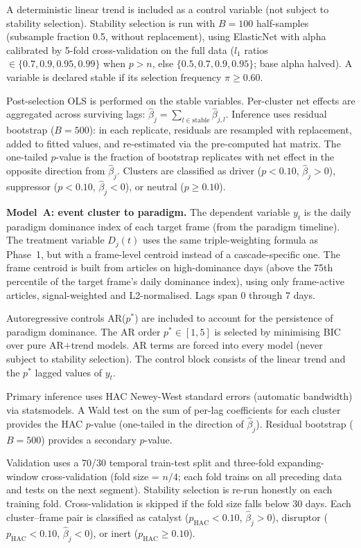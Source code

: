 A deterministic linear trend is included as a control variable (not subject to stability selection). Stability selection is run with $B = 100$ half-samples (subsample fraction 0.5, without replacement), using ElasticNet with alpha calibrated by 5-fold cross-validation on the full data ($l_1$ ratios $\in \{0.7, 0.9, 0.95, 0.99\}$ when $p > n$, else $\{0.5, 0.7, 0.9, 0.95\}$; base alpha halved). A variable is declared stable if its selection frequency $\hat{\pi} \geq 0.60$.

Post-selection OLS is performed on the stable variables. Per-cluster net effects are aggregated across surviving lags: $\hat{\beta}_j = \sum_{l \in \text{stable}} \hat{\beta}_{j,l}$. Inference uses residual bootstrap ($B = 500$): in each replicate, residuals are resampled with replacement, added to fitted values, and re-estimated via the pre-computed hat matrix. The one-tailed $p$-value is the fraction of bootstrap replicates with net effect in the opposite direction from $\hat{\beta}_j$. Clusters are classified as driver ($p < 0.10$, $\hat{\beta}_j > 0$), suppressor ($p < 0.10$, $\hat{\beta}_j < 0$), or neutral ($p \geq 0.10$).

\textbf{Model~A: event cluster to paradigm.} The dependent variable $y_t$ is the daily paradigm dominance index of each target frame (from the paradigm timeline). The treatment variable $D_j(t)$ uses the same triple-weighting formula as Phase~1, but with a frame-level centroid instead of a cascade-specific one. The frame centroid is built from articles on high-dominance days (above the 75th percentile of the target frame's daily dominance index), using only frame-active articles, signal-weighted and L2-normalised. Lags span 0 through 7 days.

Autoregressive controls AR($p^*$) are included to account for the persistence of paradigm dominance. The AR order $p^* \in [1, 5]$ is selected by minimising BIC over pure AR$+$trend models. AR terms are forced into every model (never subject to stability selection). The control block consists of the linear trend and the $p^*$ lagged values of $y_t$.

Primary inference uses HAC Newey-West standard errors (automatic bandwidth) via statsmodels. A Wald test on the sum of per-lag coefficients for each cluster provides the HAC $p$-value (one-tailed in the direction of $\hat{\beta}_j$). Residual bootstrap ($B = 500$) provides a secondary $p$-value.

Validation uses a 70/30 temporal train-test split and three-fold expanding-window cross-validation (fold size = $n/4$; each fold trains on all preceding data and tests on the next segment). Stability selection is re-run honestly on each training fold. Cross-validation is skipped if the fold size falls below 30 days. Each cluster--frame pair is classified as catalyst ($p_{\text{HAC}} < 0.10$, $\hat{\beta}_j > 0$), disruptor ($p_{\text{HAC}} < 0.10$, $\hat{\beta}_j < 0$), or inert ($p_{\text{HAC}} \geq 0.10$).

